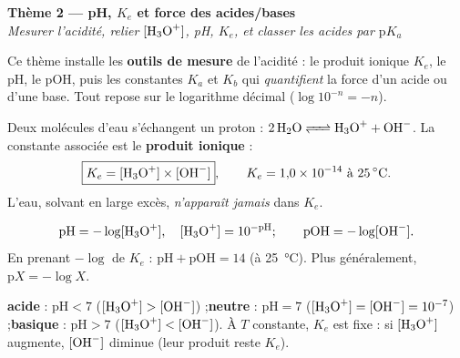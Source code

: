 \documentclass[11pt,a4paper]{article}
\begin{document}

\begin{center}
{\LARGE\bfseries\color{primarydark} Thème 2 — pH, $K_e$ et force des acides/bases}\\[2pt]
{\color{primary}\itshape Mesurer l'acidité, relier $[\ce{H3O+}]$, pH, $K_e$, et classer les acides par $\mathrm{p}K_a$}
\end{center}

\medskip
Ce thème installe les \textbf{outils de mesure} de l'acidité : le produit ionique $K_e$, le pH, le pOH, puis les
constantes $K_a$ et $K_b$ qui \emph{quantifient} la force d'un acide ou d'une base. Tout repose sur le
logarithme décimal ($\log 10^{-n} = -n$).

\begin{cle}
Deux molécules d'eau s'échangent un proton : $\ce{2 H2O <=> H3O+ + OH-}$. La constante associée est le
\textbf{produit ionique} :
\[ \boxed{K_e = [\ce{H3O+}]\times[\ce{OH-}]},\qquad K_e = 1{,}0\times10^{-14}\ \text{à \qty{25}{\celsius}}. \]
L'eau, solvant en large excès, \emph{n'apparaît jamais} dans $K_e$.
\end{cle}

\begin{cle}
\[ \mathrm{pH} = -\log[\ce{H3O+}],\quad [\ce{H3O+}] = 10^{-\mathrm{pH}};\qquad \mathrm{pOH} = -\log[\ce{OH-}]. \]
En prenant $-\log$ de $K_e$ : $\boxed{\mathrm{pH} + \mathrm{pOH} = 14}$ (à \qty{25}{\celsius}). Plus généralement,
$\mathrm{p}X = -\log X$.
\end{cle}

\begin{center}
\end{center}

\begin{cle}
\textbf{acide} : $\mathrm{pH}<7$ ($[\ce{H3O+}]>[\ce{OH-}]$) ;\quad \textbf{neutre} : $\mathrm{pH}=7$
($[\ce{H3O+}]=[\ce{OH-}]=10^{-7}$) ;\quad \textbf{basique} : $\mathrm{pH}>7$ ($[\ce{H3O+}]<[\ce{OH-}]$).
À $T$ constante, $K_e$ est fixe : si $[\ce{H3O+}]$ augmente, $[\ce{OH-}]$ diminue (leur produit reste $K_e$).
\end{cle}
\end{document}
